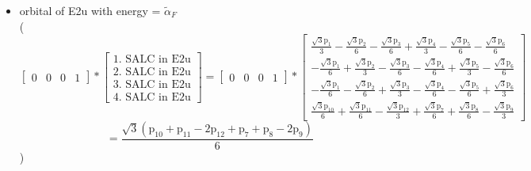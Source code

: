 \documentclass[12pt,a4paper]{article}
\begin{document}
\begin{itemize}
\textcolor{red}{Error in Orthogonalization of SALCs}\textcolor{red}{Error in Orthogonalization of SALCs}\textcolor{red}{Error in Orthogonalization of SALCs}\item orbital of E2u with energy = 
                                $\tilde{\alpha}_{F}$ \\
( 
$$
\left[\begin{matrix}0 & 0 & 0 & 1\end{matrix}\right] * \left[\begin{array}{c}\text{1. SALC in E2u} \\ \text{2. SALC in E2u} \\ \text{3. SALC in E2u} \\ \text{4. SALC in E2u}\end{array}\right] = \left[\begin{matrix}0 & 0 & 0 & 1\end{matrix}\right] * \left[\begin{matrix}\frac{\sqrt{3} \text{p}_{1}}{3} - \frac{\sqrt{3} \text{p}_{2}}{6} - \frac{\sqrt{3} \text{p}_{3}}{6} + \frac{\sqrt{3} \text{p}_{4}}{3} - \frac{\sqrt{3} \text{p}_{5}}{6} - \frac{\sqrt{3} \text{p}_{6}}{6}\\- \frac{\sqrt{3} \text{p}_{1}}{6} + \frac{\sqrt{3} \text{p}_{2}}{3} - \frac{\sqrt{3} \text{p}_{3}}{6} - \frac{\sqrt{3} \text{p}_{4}}{6} + \frac{\sqrt{3} \text{p}_{5}}{3} - \frac{\sqrt{3} \text{p}_{6}}{6}\\- \frac{\sqrt{3} \text{p}_{1}}{6} - \frac{\sqrt{3} \text{p}_{2}}{6} + \frac{\sqrt{3} \text{p}_{3}}{3} - \frac{\sqrt{3} \text{p}_{4}}{6} - \frac{\sqrt{3} \text{p}_{5}}{6} + \frac{\sqrt{3} \text{p}_{6}}{3}\\\frac{\sqrt{3} \text{p}_{10}}{6} + \frac{\sqrt{3} \text{p}_{11}}{6} - \frac{\sqrt{3} \text{p}_{12}}{3} + \frac{\sqrt{3} \text{p}_{7}}{6} + \frac{\sqrt{3} \text{p}_{8}}{6} - \frac{\sqrt{3} \text{p}_{9}}{3}\end{matrix}\right] 
 $$ $$ = \frac{\sqrt{3} \left(\text{p}_{10} + \text{p}_{11} - 2 \text{p}_{12} + \text{p}_{7} + \text{p}_{8} - 2 \text{p}_{9}\right)}{6} 
 $$ 
 )


\end{itemize}
\end{document}
